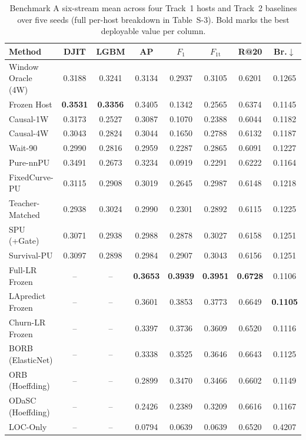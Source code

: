 \documentclass[pdflatex,sn-basic]{sn-jnl}
\theoremstyle{definition}
\theoremstyle{plain}
\begin{document}
\begin{table}[t]
\centering
\caption{Benchmark A six-stream mean across four Track~1 hosts and Track~2 baselines over five seeds (full per-host breakdown in Table~S-3). Bold marks the best deployable value per column.}
\label{tab:bench_a_main}
\fontsize{7.5}{9.0}\selectfont
\setlength{\tabcolsep}{1.8pt}
\begin{tabular*}{\textwidth}{@{\extracolsep\fill}lccccccc@{}}
\toprule
\textbf{Method} & \textbf{DJIT} & \textbf{LGBM} & \textbf{AP} & \textbf{$F_1$} & \textbf{$F_{1\mathrm{t}}$} & \textbf{R@20} & \textbf{Br.$\downarrow$} \\
\midrule
Window Oracle (4W) & 0.3188 & 0.3241 & 0.3134 & 0.2937 & 0.3105 & 0.6201 & 0.1265 \\
\midrule
Frozen Host & \textbf{0.3531} & \textbf{0.3356} & 0.3405 & 0.1342 & 0.2565 & 0.6374 & 0.1145 \\
Causal-1W & 0.3173 & 0.2527 & 0.3087 & 0.1070 & 0.2388 & 0.6044 & 0.1182 \\
Causal-4W & 0.3043 & 0.2824 & 0.3044 & 0.1650 & 0.2788 & 0.6132 & 0.1187 \\
Wait-90 & 0.2990 & 0.2816 & 0.2959 & 0.2287 & 0.2865 & 0.6091 & 0.1227 \\
Pure-nnPU & 0.3491 & 0.2673 & 0.3234 & 0.0919 & 0.2291 & 0.6222 & 0.1164 \\
FixedCurve-PU & 0.3115 & 0.2908 & 0.3019 & 0.2645 & 0.2987 & 0.6148 & 0.1218 \\
Teacher-Matched & 0.2938 & 0.3024 & 0.2990 & 0.2301 & 0.2892 & 0.6115 & 0.1225 \\
SPU (+Gate) & 0.3071 & 0.2938 & 0.2988 & 0.2878 & 0.3027 & 0.6158 & 0.1251 \\
Survival-PU & 0.3097 & 0.2898 & 0.2984 & 0.2907 & 0.3043 & 0.6156 & 0.1251 \\
\midrule
Full-LR Frozen & -- & -- & \textbf{0.3653} & \textbf{0.3939} & \textbf{0.3951} & \textbf{0.6728} & 0.1106 \\
LApredict Frozen & -- & -- & 0.3601 & 0.3853 & 0.3773 & 0.6649 & \textbf{0.1105} \\
Churn-LR Frozen & -- & -- & 0.3397 & 0.3736 & 0.3609 & 0.6520 & 0.1116 \\
BORB (ElasticNet) & -- & -- & 0.3338 & 0.3525 & 0.3646 & 0.6643 & 0.1125 \\
ORB (Hoeffding) & -- & -- & 0.2899 & 0.3470 & 0.3466 & 0.6602 & 0.1149 \\
ODaSC (Hoeffding) & -- & -- & 0.2426 & 0.2389 & 0.3209 & 0.6616 & 0.1167 \\
LOC-Only & -- & -- & 0.0794 & 0.0639 & 0.0639 & 0.6520 & 0.4207 \\
\bottomrule
\end{tabular*}
\vspace{2pt}\par{}
\end{table}
\end{document}
